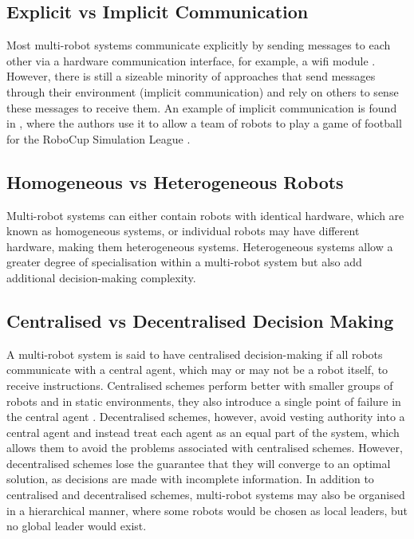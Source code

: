 \subsection{Explicit vs Implicit Communication}
Most multi-robot systems communicate explicitly by sending messages to each other via a hardware communication interface, for example, a wifi module \cite{MultiRobotCoordinationSurvey}. However, there is still a sizeable minority of approaches that send messages through their environment (implicit communication) and rely on others to sense these messages to receive them. An example of implicit communication is found in \cite{FootballRobots}, where the authors use it to allow a team of robots to play a game of football for the RoboCup Simulation League \cite{RoboCup}.

\subsection{Homogeneous vs Heterogeneous Robots}
Multi-robot systems can either contain robots with identical hardware, which are known as homogeneous systems, or individual robots may have different hardware, making them heterogeneous systems. Heterogeneous systems allow a greater degree of specialisation within a multi-robot system but also add additional decision-making complexity.

\subsection{Centralised vs Decentralised Decision Making}
A multi-robot system is said to have centralised decision-making if all robots communicate with a central agent, which may or may not be a robot itself, to receive instructions. Centralised schemes perform better with smaller groups of robots and in static environments, they also introduce a single point of failure in the central agent \cite{MultiRobotCoordinationSurvey}. Decentralised schemes, however, avoid vesting authority into a central agent and instead treat each agent as an equal part of the system, which allows them to avoid the problems associated with centralised schemes. However, decentralised schemes lose the guarantee that they will converge to an optimal solution, as decisions are made with incomplete information. %
In addition to centralised and decentralised schemes, multi-robot systems may also be organised in a hierarchical manner, where some robots would be chosen as local leaders, but no global leader would exist.

